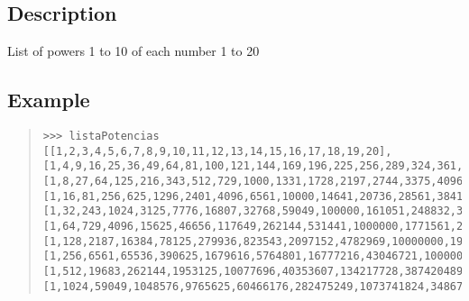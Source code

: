 \begin{haddockdesc}
\item[\begin{tabular}{@{}l}
listaPotencias :: {\char 91}{\char 91}Int{\char 93}{\char 93}
\end{tabular}]
{\haddockbegindoc
\section*{Description}
List of powers 1 to 10 of each number 1 to 20\par
\subsection*{Example}
\begin{quote}
{\haddockverb\begin{verbatim}
>>> listaPotencias
[[1,2,3,4,5,6,7,8,9,10,11,12,13,14,15,16,17,18,19,20],[1,4,9,16,25,36,49,64,81,100,121,144,169,196,225,256,289,324,361,400],[1,8,27,64,125,216,343,512,729,1000,1331,1728,2197,2744,3375,4096,4913,5832,6859,8000],[1,16,81,256,625,1296,2401,4096,6561,10000,14641,20736,28561,38416,50625,65536,83521,104976,130321,160000],[1,32,243,1024,3125,7776,16807,32768,59049,100000,161051,248832,371293,537824,759375,1048576,1419857,1889568,2476099,3200000],[1,64,729,4096,15625,46656,117649,262144,531441,1000000,1771561,2985984,4826809,7529536,11390625,16777216,24137569,34012224,47045881,64000000],[1,128,2187,16384,78125,279936,823543,2097152,4782969,10000000,19487171,35831808,62748517,105413504,170859375,268435456,410338673,612220032,893871739,1280000000],[1,256,6561,65536,390625,1679616,5764801,16777216,43046721,100000000,214358881,429981696,815730721,1475789056,2562890625,4294967296,6975757441,11019960576,16983563041,25600000000],[1,512,19683,262144,1953125,10077696,40353607,134217728,387420489,1000000000,2357947691,5159780352,10604499373,20661046784,38443359375,68719476736,118587876497,198359290368,322687697779,512000000000],[1,1024,59049,1048576,9765625,60466176,282475249,1073741824,3486784401,10000000000,25937424601,61917364224,137858491849,289254654976,576650390625,1099511627776,2015993900449,3570467226624,6131066257801,10240000000000]]

\end{verbatim}}
\end{quote}}
\end{haddockdesc}
